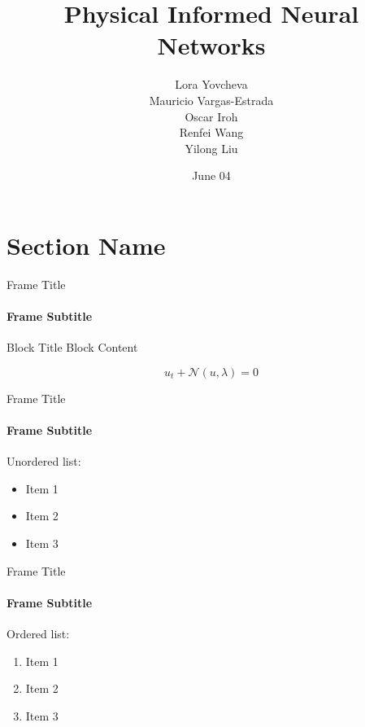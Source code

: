 \documentclass{beamer}
\title{Physical Informed Neural Networks}
\date{June 04}
\author{Lora Yovcheva\\
Mauricio Vargas-Estrada\\
Oscar Iroh\\
Renfei Wang\\
Yilong Liu}
\begin{document}
\insertTitleSlide


\section{Section Name}

\begin{frame}{Frame Title}
\framesubtitle{Frame Subtitle} 
    \begin{block}{Block Title}
        Block Content

        \begin{equation}
            u_t + \mathcal{N}(u, \lambda) = 0
        \end{equation}
    \end{block}
\end{frame}

\begin{frame}{Frame Title}
\framesubtitle{Frame Subtitle} 

Unordered list:

\begin{itemize}
    \item Item 1
    \item Item 2
    \item Item 3
\end{itemize}
\end{frame}

\begin{frame}{Frame Title}
\framesubtitle{Frame Subtitle} 

Ordered list:

\begin{enumerate}
    \item Item 1
    \item Item 2
    \item Item 3
\end{enumerate}

\end{frame}







\insertLastSlide
\end{document}
